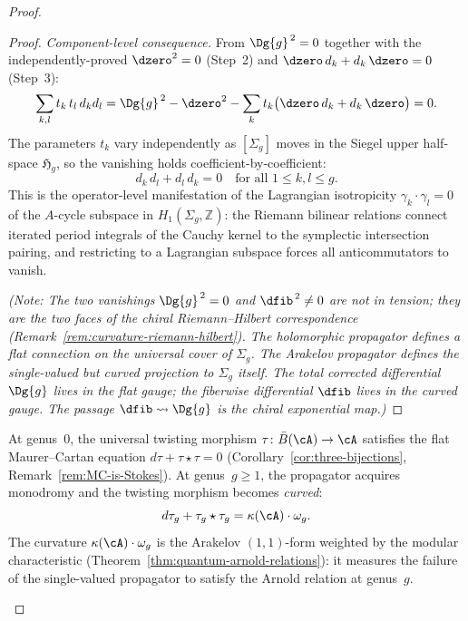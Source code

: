 \begin{proof}
\begin{proof}
\emph{Component-level consequence.}
From $\Dg{g}^{\,2} = 0$ together with the
independently-proved $\dzero^2 = 0$ (Step~2) and
$\dzero\, d_k + d_k\,\dzero = 0$ (Step~3):
\[
 \sum_{k,l} t_k\,t_l\, d_k d_l
 = \Dg{g}^{\,2} - \dzero^2
 - \sum_k t_k\bigl(\dzero\,d_k + d_k\,\dzero\bigr)
 = 0.
\]
The parameters $t_k$ vary independently as
$[\Sigma_g]$ moves in the Siegel upper half-space
$\mathfrak{H}_g$, so the vanishing holds coefficient-by-coefficient:
\[
 d_k\,d_l + d_l\,d_k = 0
 \quad\text{for all } 1 \le k,l \le g.
\]
This is the operator-level manifestation of the Lagrangian
isotropicity $\gamma_k \cdot \gamma_l = 0$
of the $A$-cycle subspace in $H_1(\Sigma_g, \mathbb{Z})$:
the Riemann bilinear relations connect iterated period
integrals of the Cauchy kernel to the symplectic
intersection pairing, and restricting to a Lagrangian
subspace forces all anticommutators to vanish.

\emph{(Note: The two vanishings $\Dg{g}^{\,2} = 0$ and
$\dfib^{\,2} \neq 0$ are not in tension; they are the two
faces of the chiral Riemann--Hilbert correspondence
(Remark~\textup{\ref{rem:curvature-riemann-hilbert}}).
The holomorphic propagator defines a flat connection on
the universal cover of $\Sigma_g$. The Arakelov
propagator defines the single-valued but curved
projection to $\Sigma_g$ itself. The total corrected
differential $\Dg{g}$ lives in the flat gauge; the
fiberwise differential $\dfib$ lives in the curved gauge.
The passage $\dfib \leadsto \Dg{g}$ is the chiral
exponential map.)} \qedhere
\end{proof}

\begin{remark}
\label{rem:curved-twisting-higher-genus}
At genus~$0$, the universal twisting morphism
$\tau\colon \bar{B}(\cA) \to \cA$ satisfies the flat
Maurer--Cartan equation $d\tau + \tau \star \tau = 0$
(Corollary~\ref{cor:three-bijections},
Remark~\ref{rem:MC-is-Stokes}).
At genus~$g \geq 1$, the propagator acquires monodromy and the
twisting morphism becomes \emph{curved}:
\begin{equation}\label{eq:curved-MC-higher-genus}
d\tau_g + \tau_g \star \tau_g = \kappa(\cA) \cdot \omega_g.
\end{equation}
The curvature $\kappa(\cA) \cdot \omega_g$ is the Arakelov
$(1,1)$-form weighted by the modular characteristic
(Theorem~\ref{thm:quantum-arnold-relations}): it measures
the failure of the single-valued propagator to satisfy the
Arnold relation at genus~$g$.


\end{remark}
\end{proof}
